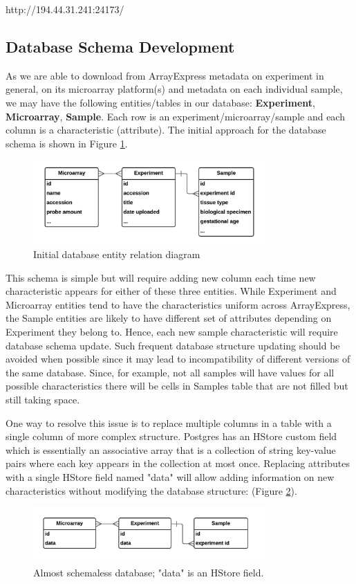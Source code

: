 \documentclass[conference]{IEEEtran}
\begin{document}
http://194.44.31.241:24173/



\subsection{Database Schema Development}

As we are able to download from ArrayExpress metadata on experiment in general, on its microarray platform(s) and metadata on each individual sample, we may have the following entities/tables in our database: \textbf{Experiment}, \textbf{Microarray}, \textbf{Sample}. Each row is an experiment/microarray/sample and each column is a characteristic (attribute). The initial approach for the database schema is shown in Figure \ref{fig:NaiveSchema}.
\begin{figure}[!t]
        \includegraphics[width=3.5in]{plots/NaiveSchema}
        \caption{Initial database entity relation diagram}
        \label{fig:NaiveSchema}
\end{figure}

This schema is simple but will require adding new column each time new characteristic appears for either of these three entities. While Experiment and Microarray entities tend to have the characteristics uniform across ArrayExpress, the Sample entities are likely to have different set of attributes depending on Experiment they belong to. Hence, each new sample characteristic will require database schema update. Such frequent database structure updating should be avoided when possible since it may lead to incompatibility of different versions of the same database. Since, for example, not all samples will have values for all possible characteristics there will be cells in Samples table that are not filled but still taking space.

One way to resolve this issue is to replace multiple columns in a table with a single column of more complex structure. Postgres has an HStore custom field \cite{CraigKerstiensSchemalessDjango, LittImprovingBSON} which is essentially an associative array that is a collection of string key-value pairs where each key appears in the collection at most once. Replacing attributes with a single HStore field named "data" will allow adding information on new characteristics without modifying the database structure: (Figure \ref{fig:HStoreSchema}).
\begin{figure}[h] 
        \includegraphics[width=3.5in]{plots/HStoreSchema}
        \caption{Almost schemaless database; "data" is an HStore field.}
        \label{fig:HStoreSchema}
\end{figure} 
\end{document}
